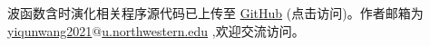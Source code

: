 
波函数含时演化相关程序源代码已上传至 \href{https://github.com/raymond931118/Time_Evolutionary_Wavepacket.git}{GitHub} (点击访问)。作者邮箱为\underline{yiqunwang2021$@$u.northwestern.edu} ,欢迎交流访问。
